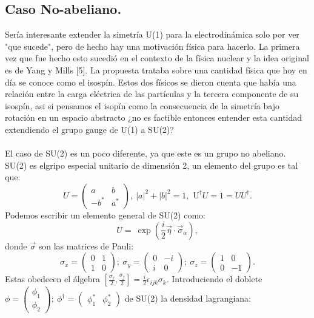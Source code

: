 \subsection{Caso No-abeliano.}
Sería interesante extender la simetría U(1) para la electrodinámica solo por ver "que sucede", pero de hecho hay una motivación física para hacerlo. La primera vez que fue hecho esto sucedió en el contexto de la física nuclear y la idea original es de Yang y Mills [5]. La propuesta trataba sobre una cantidad física que hoy en día se conoce como el isospín. Estos dos físicos se dieron cuenta que había una relación entre la carga eléctrica de las partículas y la tercera componente de su isospín, asi si pensamos el isopín como la consecuencia de la simetría bajo rotación en un espacio abstracto ¿no es factible entonces entender esta cantidad extendiendo el grupo gauge de U(1) a SU(2)?
\\
\\
El caso de SU(2) es un poco diferente, ya que este es un grupo no abeliano. SU(2) es elgripo especial unitario de dimensión 2, un elemento del grupo es tal que: 
\begin{equation}
U=\left(\begin{array}{cc}
a & b\\
-b^{*} & a^{*}
\end{array}\right),\ |a|^{2}+|b|^{2}=1,\text{\ U}^{\dagger}U=1=UU^{\dagger}.
\end{equation}
Podemos escribir un elemento general de SU(2) como: 
\begin{equation}
U=\ \exp\left(\frac{i}{2}\vec{\eta}\cdot\vec{\sigma}_\alpha\right),
\end{equation}
donde $\vec{\sigma}$ son las matrices de Pauli:
\begin{equation}
\sigma_{x}=\left(\begin{array}{cc}
0 & 1\\
1 & 0
\end{array}\right);\ \sigma_{y}=\left(\begin{array}{cc}
0 & -i\\
i & 0
\end{array}\right);\ \sigma_{z}=\left(\begin{array}{cc}
1 & 0\\
0 & -1
\end{array}\right) .
\end{equation}
Estas obedecen el álgebra $[\frac{\sigma_i}{2},\frac{\sigma_j}{2}]=\frac{i}{2}\epsilon_{ijk}\sigma_k$.
Introduciendo el doblete $\phi=\left(\begin{array}{c}
\phi_{1}\\
\phi_{2}
\end{array}\right);\ \phi^{\dagger}=\left(\begin{array}{cc}
\phi_{1}^{*} & \phi_{2}^{*}\end{array}\right)$ de SU(2) la densidad lagrangiana:
